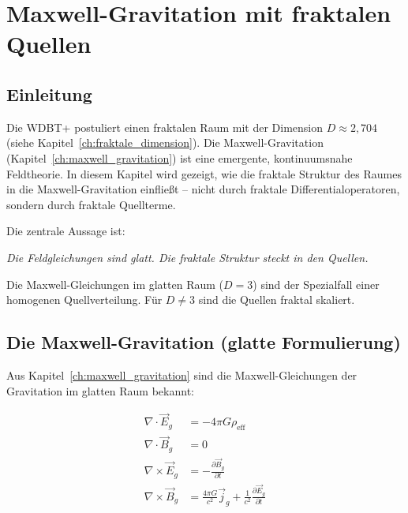 
\chapter{Maxwell-Gravitation mit fraktalen Quellen}
\label{ch:fraktale_maxwell}

\section{Einleitung}
\label{sec:fm_einleitung}

Die WDBT+ postuliert einen fraktalen Raum mit der Dimension \( D \approx 2,704 \) (siehe Kapitel~\ref{ch:fraktale_dimension}). Die Maxwell-Gravitation (Kapitel~\ref{ch:maxwell_gravitation}) ist eine emergente, kontinuumsnahe Feldtheorie. In diesem Kapitel wird gezeigt, wie die fraktale Struktur des Raumes in die Maxwell-Gravitation einfließt – nicht durch fraktale Differentialoperatoren, sondern durch fraktale Quellterme.

Die zentrale Aussage ist:

\begin{center}
    \emph{Die Feldgleichungen sind glatt. Die fraktale Struktur steckt in den Quellen.}
\end{center}

Die Maxwell-Gleichungen im glatten Raum (\( D = 3 \)) sind der Spezialfall einer homogenen Quellverteilung. Für \( D \neq 3 \) sind die Quellen fraktal skaliert.

\section{Die Maxwell-Gravitation (glatte Formulierung)}
\label{sec:fm_glatt}

Aus Kapitel~\ref{ch:maxwell_gravitation} sind die Maxwell-Gleichungen der Gravitation im glatten Raum bekannt:

\[
\begin{aligned}
\nabla \cdot \vec{E}_g &= -4\pi G \rho_{\text{eff}} \\
\nabla \cdot \vec{B}_g &= 0 \\
\nabla \times \vec{E}_g &= -\frac{\partial \vec{B}_g}{\partial t} \\
\nabla \times \vec{B}_g &= \frac{4\pi G}{c^2} \vec{j}_g + \frac{1}{c^2} \frac{\partial \vec{E}_g}{\partial t}
\end{aligned}
\]

